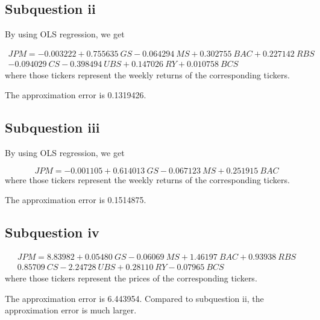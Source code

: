 \documentclass{article}
\DeclareMathOperator{\1}{\mathit{1}}
\numberwithin{figure}{section} %
\numberwithin{table}{section}
\begin{document}
\subsection{Subquestion ii}

By using OLS regression, we get

	\begin{multline*}
	JPM =     -0.003222    +    0.755635~ GS      -0.064294~ MS   +    0.302755~ BAC    +    0.227142~  RBS \\
     -0.094029~ CS     -0.398494~ UBS   +    0.147026~ RY    +   0.010758~ BCS
	\end{multline*}
where those tickers represent the weekly returns of the corresponding tickers.	
	
The approximation error is 0.1319426.

\subsection{Subquestion iii}

By using OLS regression, we get

	\begin{equation*}
	JPM =     -0.001105 +     0.614013~GS    -0.067123~MS+     0.251915~BAC
	\end{equation*}
	where those tickers represent the weekly returns of the corresponding tickers.
	
The approximation error is 0.1514875.

\subsection{Subquestion iv}

	\begin{multline*}
	JPM =     8.83982    +    0.05480~ GS      -0.06069~ MS   +    1.46197~ BAC    +    0.93938~  RBS \\
     0.85709~ CS     -2.24728~ UBS   +    0.28110~ RY    -   0.07965~ BCS
	\end{multline*}
where those tickers represent the prices of the corresponding tickers.	
	
The approximation error is 6.443954. Compared to subquestion ii, the approximation error is much larger.
\end{document}
